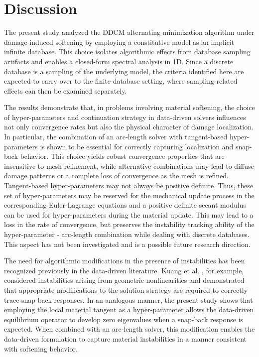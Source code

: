 \documentclass[10pt,review]{cas-sc}
\begin{document}
\section{Discussion}

The present study analyzed the DDCM alternating minimization algorithm under damage-induced softening by employing a constitutive model as an implicit infinite database. This choice isolates algorithmic effects from database sampling artifacts and enables a closed-form spectral analysis in 1D. Since a discrete database is a sampling of the underlying model, the criteria identified here are expected to carry over to the finite-database setting, where sampling-related effects can then be examined separately.

The results demonstrate that, in problems involving material softening, the choice of hyper-parameters and continuation strategy in data-driven solvers influences not only convergence rates but also the physical character of damage localization. In particular, the combination of an arc-length solver with tangent-based hyper-parameters is shown to be essential for correctly capturing localization and snap-back behavior. This choice yields robust convergence properties that are insensitive to mesh refinement, while alternative combinations may lead to diffuse damage patterns or a complete loss of convergence as the mesh is refined. Tangent-based hyper-parameters may not always be positive definite. Thus, these set of hyper-parameters may be reserved for the mechanical update process in the corresponding Euler-Lagrange equations and a positive definite secant modulus can be used for hyper-parameters during the material update. This may lead to a loss in the rate of convergence, but preserves the instability tracking ability of the hyper-parameter - arc-length combination while dealing with discrete databases. This aspect has not been investigated and is a possible future research direction.

The need for algorithmic modifications in the presence of instabilities has been recognized previously in the data-driven literature. Kuang et al. \cite{Kuang2023}, for example, considered instabilities arising from geometric nonlinearities and demonstrated that appropriate modifications to the solution strategy are required to correctly trace snap-back responses. In an analogous manner, the present study shows that employing the local material tangent as a hyper-parameter allows the data-driven equilibrium operator to develop zero eigenvalues when a snap-back response is expected. When combined with an arc-length solver, this modification enables the data-driven formulation to capture material instabilities in a manner consistent with softening behavior.
\end{document}
